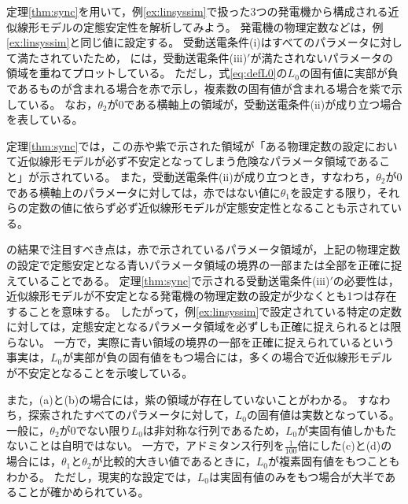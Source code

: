 \documentclass[tombow,dvipdfmx]{corona-a5-1.1}
\begin{document}
\begin{例}[受動送電条件に基づく定態安定性解析]\label{ex:linthm}
定理\ref{thm:sync}を用いて，例\ref{ex:linsyssim}で扱った3つの発電機から構成される近似線形モデルの定態安定性を解析してみよう。
発電機の物理定数などは，例\ref{ex:linsyssim}と同じ値に設定する。
受動送電条件(i)はすべてのパラメータに対して満たされていたため，
には，受動送電条件(iii)$'$が満たされないパラメータの領域を重ねてプロットしている。
ただし，式\ref{eq:defL0}の$L_0$の固有値に実部が負であるものが含まれる場合を赤で示し，複素数の固有値が含まれる場合を紫で示している。
なお，$\theta_2$が0である横軸上の領域が，受動送電条件(ii)が成り立つ場合を表している。

定理\ref{thm:sync}では，この赤や紫で示された領域が「ある物理定数の設定において近似線形モデルが必ず不安定となってしまう危険なパラメータ領域であること」が示されている。
また，受動送電条件(ii)が成り立つとき，すなわち，$\theta_2$が0である横軸上のパラメータに対しては，赤ではない値に$\theta_1$を設定する限り，それらの定数の値に依らず必ず近似線形モデルが定態安定性となることも示されている。

の結果で注目すべき点は，赤で示されているパラメータ領域が，上記の物理定数の設定で定態安定となる青いパラメータ領域の境界の一部または全部を正確に捉えていることである。
定理\ref{thm:sync}で示される受動送電条件(iii)$'$の必要性は，近似線形モデルが不安定となる発電機の物理定数の設定が少なくとも1つは存在することを意味する。
したがって，例\ref{ex:linsyssim}で設定されている特定の定数に対しては，定態安定となるパラメータ領域を必ずしも正確に捉えられるとは限らない。
一方で，実際に青い領域の境界の一部を正確に捉えられているという事実は，$L_0$が実部が負の固有値をもつ場合には，多くの場合で近似線形モデルが不安定となることを示唆している。

また，(a)と(b)の場合には，紫の領域が存在していないことがわかる。
すなわち，探索されたすべてのパラメータに対して，$L_0$の固有値は実数となっている。
一般に，$\theta_2$が0でない限り$L_0$は非対称な行列であるため，$L_0$が実固有値しかもたないことは自明ではない。
一方で，アドミタンス行列を$\tfrac{1}{100}$倍にした(c)と(d)の場合には，$\theta_1$と$\theta_2$が比較的大きい値であるときに，$L_0$が複素固有値をもつこともわかる。
ただし，現実的な設定では，$L_0$は実固有値のみをもつ場合が大半であることが確かめられている。
\end{例}
\end{document}

